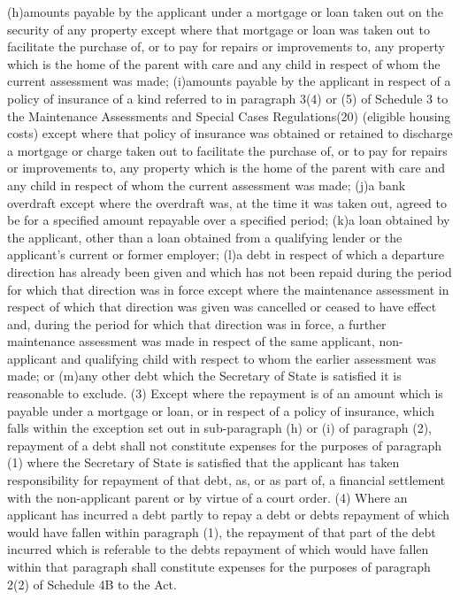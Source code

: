 \documentclass[a4paper]{article}
\begin{document}
(h)amounts payable by the applicant under a mortgage or loan taken out on the
security of any property except where that mortgage or loan was taken out to
facilitate the purchase of, or to pay for repairs or improvements to, any
property which is the home of the parent with care and any child in respect of
whom the current assessment was made;
(i)amounts payable by the applicant in respect of a policy of insurance of a
kind referred to in paragraph 3(4) or (5) of Schedule 3 to the Maintenance
Assessments and Special Cases Regulations(20) (eligible housing costs) except
where that policy of insurance was obtained or retained to discharge a mortgage
or charge taken out to facilitate the purchase of, or to pay for repairs or
improvements to, any property which is the home of the parent with care and any
child in respect of whom the current assessment was made;
(j)a bank overdraft except where the overdraft was, at the time it was taken
out, agreed to be for a specified amount repayable over a specified period;
(k)a loan obtained by the applicant, other than a loan obtained from a
qualifying lender or the applicant’s current or former employer;
(l)a debt in respect of which a departure direction has already been given and
which has not been repaid during the period for which that direction was in
force except where the maintenance assessment in respect of which that direction
was given was cancelled or ceased to have effect and, during the period for
which that direction was in force, a further maintenance assessment was made in
respect of the same applicant, non-applicant and qualifying child with respect
to whom the earlier assessment was made; or
(m)any other debt which the Secretary of State is satisfied it is reasonable to
exclude.
(3) Except where the repayment is of an amount which is payable under a mortgage
or loan, or in respect of a policy of insurance, which falls within the
exception set out in sub-paragraph (h) or (i) of paragraph (2), repayment of a
debt shall not constitute expenses for the purposes of paragraph (1) where the
Secretary of State is satisfied that the applicant has taken responsibility for
repayment of that debt, as, or as part of, a financial settlement with the
non-applicant parent or by virtue of a court order.
(4) Where an applicant has incurred a debt partly to repay a debt or debts
repayment of which would have fallen within paragraph (1), the repayment of that
part of the debt incurred which is referable to the debts repayment of which
would have fallen within that paragraph shall constitute expenses for the
purposes of paragraph 2(2) of Schedule 4B to the Act.
\end{document}
